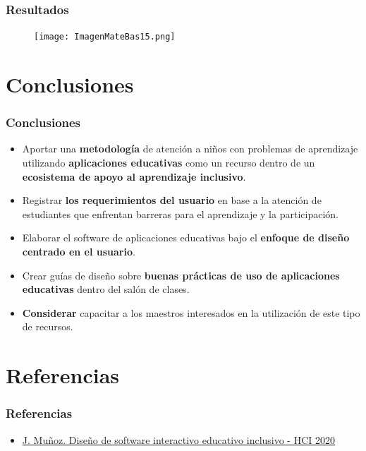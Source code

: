 \documentclass[11pt]{beamer}
\begin{document}
\begin{frame}
\frametitle{Resultados}
    \begin{figure}
    \centering
     \texttt{[image: ImagenMateBas15.png]}
    \end{figure}
\end{frame}

\section{Conclusiones}
\begin{frame}
\frametitle{Conclusiones}
\begin{itemize}
\item Aportar una {\bf metodología} de atención a niños con problemas de aprendizaje utilizando {\bf aplicaciones educativas} como un recurso dentro de un {\bf ecosistema de apoyo al aprendizaje inclusivo}.
\item Registrar {\bf los requerimientos del usuario} en base a la atención de estudiantes que enfrentan barreras para el aprendizaje y la participación.
\item Elaborar el software de aplicaciones educativas bajo el {\bf enfoque de diseño centrado en el usuario}.
\item Crear guías de diseño sobre {\bf buenas prácticas de uso de aplicaciones educativas} dentro del salón de clases.
\item {\bf Considerar} capacitar a los maestros interesados en la utilización de este tipo de recursos.
\end{itemize}
\end{frame}

\section{Referencias}
\begin{frame}
\frametitle{Referencias}
\begin{itemize}
\item \href{https://www.youtube.com/watch?v=F0nOl4GRfC4&t=1577s}{J. Muñoz. Diseño de software interactivo educativo inclusivo - HCI 2020}
\end{itemize}
\end{frame}
\end{document}
